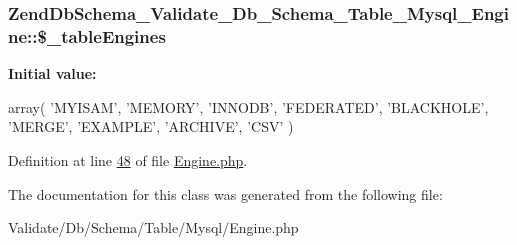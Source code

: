 \hypertarget{classZendDbSchema__Validate__Db__Schema__Table__Mysql__Engine_ab57e0cd7edeaef9c2b50a72355e1c2d9}{
\subsubsection[{\$\-\_\-table\-Engines}]{\setlength{\rightskip}{0pt plus 5cm}\-Zend\-Db\-Schema\-\_\-\-Validate\-\_\-\-Db\-\_\-\-Schema\-\_\-\-Table\-\_\-\-Mysql\-\_\-\-Engine\-::\$\-\_\-table\-Engines}}\label{classZendDbSchema__Validate__Db__Schema__Table__Mysql__Engine_ab57e0cd7edeaef9c2b50a72355e1c2d9}
{\bfseries \-Initial value\-:}
\begin{DoxyCode}
 array(
        \textcolor{stringliteral}{'MYISAM'},
        \textcolor{stringliteral}{'MEMORY'},
        \textcolor{stringliteral}{'INNODB'},
        \textcolor{stringliteral}{'FEDERATED'},
        \textcolor{stringliteral}{'BLACKHOLE'},
        \textcolor{stringliteral}{'MERGE'},
        \textcolor{stringliteral}{'EXAMPLE'},
        \textcolor{stringliteral}{'ARCHIVE'},
        \textcolor{stringliteral}{'CSV'}
    )
\end{DoxyCode}


\-Definition at line \hyperlink{Engine_8php_source_l00048}{48} of file \hyperlink{Engine_8php_source}{\-Engine.\-php}.



\-The documentation for this class was generated from the following file\-:\begin{DoxyCompactItemize}
\item 
\-Validate/\-Db/\-Schema/\-Table/\-Mysql/\-Engine.\-php\end{DoxyCompactItemize}
